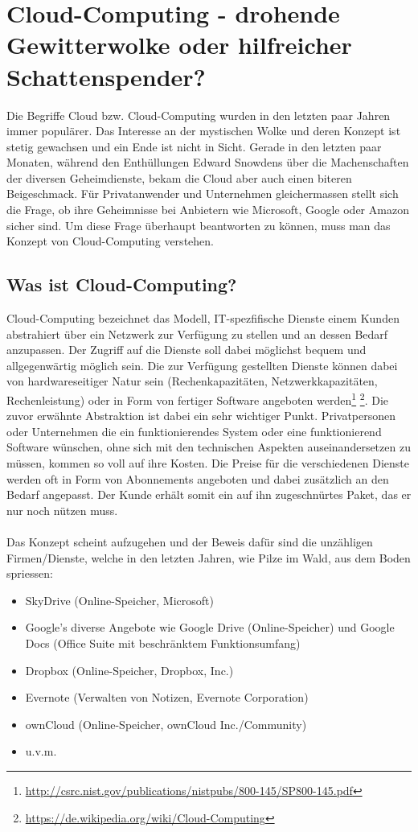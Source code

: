 \newpage
\section{Cloud-Computing - drohende Gewitterwolke oder hilfreicher Schattenspender?}
Die Begriffe Cloud bzw. Cloud-Computing wurden in den letzten paar Jahren immer populärer. Das Interesse an der mystischen Wolke und deren Konzept ist stetig gewachsen und ein Ende ist nicht in Sicht. Gerade in den letzten paar Monaten, während den Enthüllungen Edward Snowdens über die Machenschaften der diversen Geheimdienste, bekam die Cloud aber auch einen biteren Beigeschmack. Für Privatanwender und Unternehmen gleichermassen stellt sich die Frage, ob ihre Geheimnisse bei Anbietern wie Microsoft, Google oder Amazon sicher sind. Um diese Frage überhaupt beantworten zu können, muss man das Konzept von Cloud-Computing verstehen.

\subsection{Was ist Cloud-Computing?}
Cloud-Computing bezeichnet das Modell, IT-spezfifische Dienste einem Kunden abstrahiert über ein Netzwerk zur Verfügung zu stellen und an dessen Bedarf anzupassen. Der Zugriff auf die Dienste soll dabei möglichst bequem und allgegenwärtig möglich sein. Die zur Verfügung gestellten Dienste können dabei von hardwareseitiger Natur sein (Rechenkapazitäten, Netzwerkkapazitäten, Rechenleistung) oder in Form von fertiger Software angeboten werden\footnote{\url{http://csrc.nist.gov/publications/nistpubs/800-145/SP800-145.pdf}} \footnote{\url{https://de.wikipedia.org/wiki/Cloud-Computing}}.
Die zuvor erwähnte Abstraktion ist dabei ein sehr wichtiger Punkt. Privatpersonen oder Unternehmen die ein funktionierendes System oder eine funktionierend Software wünschen, ohne sich mit den technischen Aspekten auseinandersetzen zu müssen, kommen so voll auf ihre Kosten. Die Preise für die verschiedenen Dienste werden oft in Form von Abonnements angeboten und dabei zusätzlich an den Bedarf angepasst. Der Kunde erhält somit ein auf ihn zugeschnürtes Paket, das er nur noch nützen muss.
\\
\\
Das Konzept scheint aufzugehen und der Beweis dafür sind die unzähligen Firmen/Dienste, welche in den letzten Jahren, wie Pilze im Wald, aus dem Boden spriessen:
\begin{itemize}
\item SkyDrive (Online-Speicher, Microsoft)
\item Google's diverse Angebote wie Google Drive (Online-Speicher) und Google Docs (Office Suite mit beschränktem Funktionsumfang)
\item Dropbox (Online-Speicher, Dropbox, Inc.)
\item Evernote (Verwalten von Notizen, Evernote Corporation)
\item ownCloud (Online-Speicher, ownCloud Inc./Community)
\item u.v.m.
\end{itemize}

